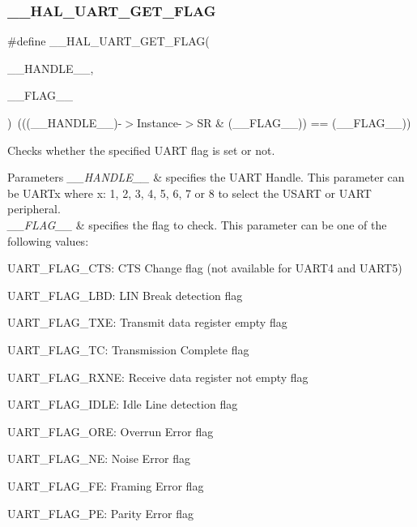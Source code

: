 \subsubsection{\texorpdfstring{\+\_\+\+\_\+\+H\+A\+L\+\_\+\+U\+A\+R\+T\+\_\+\+G\+E\+T\+\_\+\+F\+L\+AG}{\_\_HAL\_UART\_GET\_FLAG}}
{\footnotesize\ttfamily \#define \+\_\+\+\_\+\+H\+A\+L\+\_\+\+U\+A\+R\+T\+\_\+\+G\+E\+T\+\_\+\+F\+L\+AG(\begin{DoxyParamCaption}\item[{}]{\+\_\+\+\_\+\+H\+A\+N\+D\+L\+E\+\_\+\+\_\+,  }\item[{}]{\+\_\+\+\_\+\+F\+L\+A\+G\+\_\+\+\_\+ }\end{DoxyParamCaption})~(((\+\_\+\+\_\+\+H\+A\+N\+D\+L\+E\+\_\+\+\_\+)-\/$>$Instance-\/$>$SR \& (\+\_\+\+\_\+\+F\+L\+A\+G\+\_\+\+\_\+)) == (\+\_\+\+\_\+\+F\+L\+A\+G\+\_\+\+\_\+))}



Checks whether the specified U\+A\+RT flag is set or not. 


\begin{DoxyParams}{Parameters}
{\em \+\_\+\+\_\+\+H\+A\+N\+D\+L\+E\+\_\+\+\_\+} & specifies the U\+A\+RT Handle. This parameter can be U\+A\+R\+Tx where x\+: 1, 2, 3, 4, 5, 6, 7 or 8 to select the U\+S\+A\+RT or U\+A\+RT peripheral. \\
\hline
{\em \+\_\+\+\_\+\+F\+L\+A\+G\+\_\+\+\_\+} & specifies the flag to check. This parameter can be one of the following values\+: \begin{DoxyItemize}
\item U\+A\+R\+T\+\_\+\+F\+L\+A\+G\+\_\+\+C\+TS\+: C\+TS Change flag (not available for U\+A\+R\+T4 and U\+A\+R\+T5) \item U\+A\+R\+T\+\_\+\+F\+L\+A\+G\+\_\+\+L\+BD\+: L\+IN Break detection flag \item U\+A\+R\+T\+\_\+\+F\+L\+A\+G\+\_\+\+T\+XE\+: Transmit data register empty flag \item U\+A\+R\+T\+\_\+\+F\+L\+A\+G\+\_\+\+TC\+: Transmission Complete flag \item U\+A\+R\+T\+\_\+\+F\+L\+A\+G\+\_\+\+R\+X\+NE\+: Receive data register not empty flag \item U\+A\+R\+T\+\_\+\+F\+L\+A\+G\+\_\+\+I\+D\+LE\+: Idle Line detection flag \item U\+A\+R\+T\+\_\+\+F\+L\+A\+G\+\_\+\+O\+RE\+: Overrun Error flag \item U\+A\+R\+T\+\_\+\+F\+L\+A\+G\+\_\+\+NE\+: Noise Error flag \item U\+A\+R\+T\+\_\+\+F\+L\+A\+G\+\_\+\+FE\+: Framing Error flag \item U\+A\+R\+T\+\_\+\+F\+L\+A\+G\+\_\+\+PE\+: Parity Error flag \end{DoxyItemize}
\\
\hline
\end{DoxyParams}

